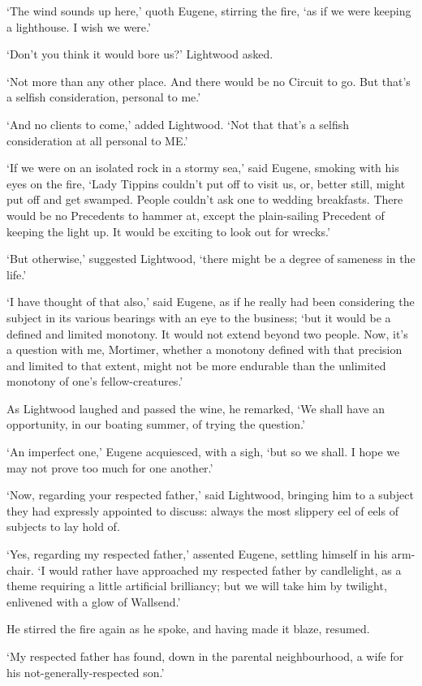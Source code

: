 ‘The wind sounds up here,’ quoth Eugene, stirring the fire, ‘as if we
were keeping a lighthouse. I wish we were.’

‘Don’t you think it would bore us?’ Lightwood asked.

‘Not more than any other place. And there would be no Circuit to go. But
that’s a selfish consideration, personal to me.’

‘And no clients to come,’ added Lightwood. ‘Not that that’s a selfish
consideration at all personal to ME.’

‘If we were on an isolated rock in a stormy sea,’ said Eugene, smoking
with his eyes on the fire, ‘Lady Tippins couldn’t put off to visit us,
or, better still, might put off and get swamped. People couldn’t ask one
to wedding breakfasts. There would be no Precedents to hammer at,
except the plain-sailing Precedent of keeping the light up. It would be
exciting to look out for wrecks.’

‘But otherwise,’ suggested Lightwood, ‘there might be a degree of
sameness in the life.’

‘I have thought of that also,’ said Eugene, as if he really had been
considering the subject in its various bearings with an eye to the
business; ‘but it would be a defined and limited monotony. It would
not extend beyond two people. Now, it’s a question with me, Mortimer,
whether a monotony defined with that precision and limited to that
extent, might not be more endurable than the unlimited monotony of one’s
fellow-creatures.’

As Lightwood laughed and passed the wine, he remarked, ‘We shall have an
opportunity, in our boating summer, of trying the question.’

‘An imperfect one,’ Eugene acquiesced, with a sigh, ‘but so we shall. I
hope we may not prove too much for one another.’

‘Now, regarding your respected father,’ said Lightwood, bringing him
to a subject they had expressly appointed to discuss: always the most
slippery eel of eels of subjects to lay hold of.

‘Yes, regarding my respected father,’ assented Eugene, settling himself
in his arm-chair. ‘I would rather have approached my respected father by
candlelight, as a theme requiring a little artificial brilliancy; but we
will take him by twilight, enlivened with a glow of Wallsend.’

He stirred the fire again as he spoke, and having made it blaze,
resumed.

‘My respected father has found, down in the parental neighbourhood, a
wife for his not-generally-respected son.’

